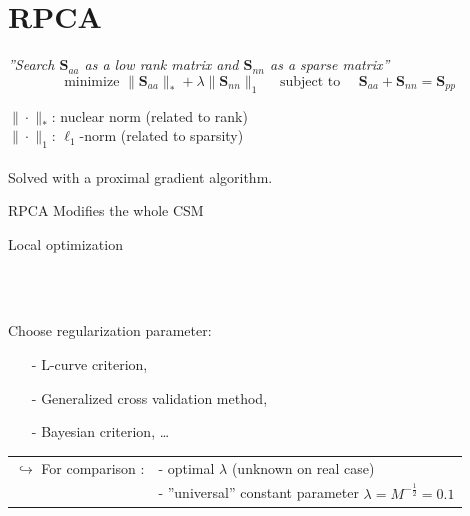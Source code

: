 \documentclass[9pt,xcolor=x11names,compress, notes=show]{beamer}%
\newcommand{\citeTransp}[1]{\color{fg!50} \citep{#1}}
\begin{document}
\section{RPCA}
\begin{frame}{\insertsectionhead}

\textit{''Search $\bm{S}_{aa}$ as a low rank matrix and $\bm{S}_{nn}$ as a sparse matrix''}
	\begin{equation*}
		\boxed{
		\text{minimize~} \|\bm{{S}}_{aa} \|_* + \lambda \| \bm{{S}}_{nn} \|_1  \text{~~~~subject to~~~~}  \bm{{S}}_{aa} +  \bm{{S}}_{nn} = \bm{S}_{pp}
		}
	\end{equation*}
	
	$\| \cdot \|_*$: nuclear norm (related to rank)\\
	$\| \cdot \|_1$: $\ell_1$-norm (related to sparsity)\\~\\
	
	Solved with a proximal gradient algorithm.

	\begin{block}{RPCA  \citeTransp{Wright2009a}}
		 Modifies the whole CSM		\hfill\parbox{0.57\linewidth}{ Local optimization}\\[2pt]
		~\hfill\parbox{0.57\linewidth}{ Choose regularization parameter:
		\small
		\begin{itemize}
			\setlength{\itemindent}{0.3cm}
		        \item[-] L-curve criterion,\\[-2pt]
		        \item[-] Generalized cross validation method,\\[-2pt]
		       \item[-] Bayesian criterion, \dots
		\end{itemize}
		}
	\end{block}
	\vfill
	\begin{tabular}{rl}
	$\hookrightarrow$ For comparison :& - optimal $\lambda$  (unknown on real case)\\
	& - ''universal'' constant  parameter $\lambda=M^{-\frac{1}{2}}=0.1$
	\end{tabular}

\end{frame}

\end{document}
